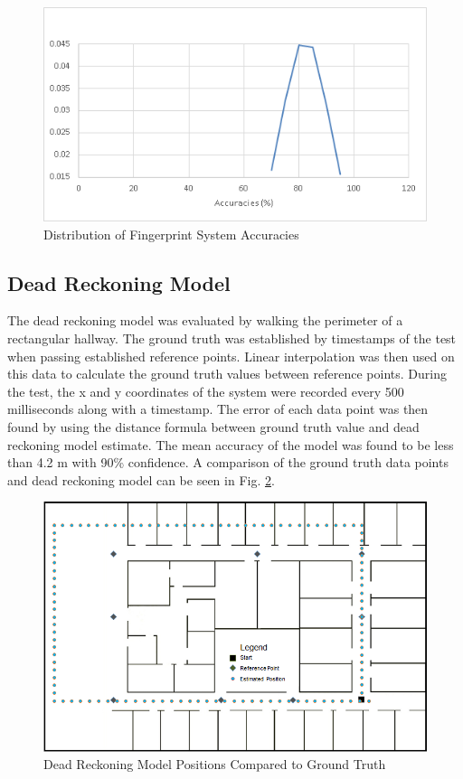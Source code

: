 \documentclass[conference]{IEEEtran}
\begin{document}
\begin{figure}[h]
\centering
\includegraphics[scale=0.65]{FingerprintDistribution.png}
\caption{Distribution of Fingerprint System Accuracies}
\captionsetup{justification=centering,margin=2cm}
\label{fig:fingerprintdistribution}
\end{figure}

\subsection{Dead Reckoning Model}

The dead reckoning model was evaluated by walking the perimeter of a rectangular hallway. The ground truth was established by timestamps of the test when passing established reference points. Linear interpolation was then used on this data to calculate the ground truth values between reference points. During the test, the x and y coordinates of the system were recorded every 500 milliseconds along with a timestamp. The error of each data point was then found by using the distance formula between ground truth value and dead reckoning model estimate. The mean accuracy of the model was found to be less than 4.2 m with 90\% confidence. A comparison of the ground truth data points and dead reckoning model can be seen in Fig. \ref{fig:drmap}.

\begin{figure}[h]
\centering
\includegraphics[scale=0.4]{DeadReckoningMap.png}
\caption{Dead Reckoning Model Positions Compared to Ground Truth}
\captionsetup{justification=centering,margin=2cm}
\label{fig:drmap}
\end{figure}
\end{document}
